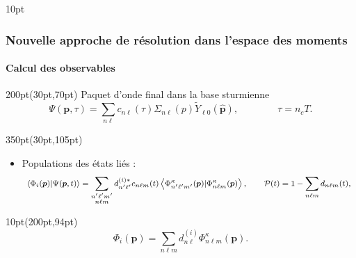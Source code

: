 \begin{frame}
\begin{textblock*}{10pt}
\end{textblock*}


\end{frame}

\begin{frame}
 \frametitle{Nouvelle approche de r\'esolution dans l'espace des moments}
 \framesubtitle{Calcul des observables}


\begin{textblock*}{200pt}(30pt,70pt)
\footnotesize
Paquet d'onde final dans la base sturmienne
\footnotesize
\begin{equation*}
   \Psi(\boldsymbol{p},\tau)
    = \sum_{n\ell} c_{n\ell}(\tau) \Sigma_{n\ell}(p)
       \widetilde{Y}_{\ell 0}(\hat{\boldsymbol{p}}),
\qquad\qquad \tau=n_{c}T.
    \label{eqn:final_wave}
\end{equation*}

\end{textblock*}


\begin{textblock*}{350pt}(30pt,105pt)
\begin{itemize}
\footnotesize
\item Populations des \'etats li\'es  :\hspace{30pt}
\begin{equation*}
\footnotesize
 \label{eqn:bound_state_pop}
 \left\langle \Phi_i(\boldsymbol{p}) | \Psi(\boldsymbol{p},t) \right\rangle
   = \sum_{\substack{n^\prime\ell^\prime m^\prime \\ n\ell m}}
    d_{n^\prime\ell^\prime}^{(i)\ast}  c_{n\ell m }(t)
  \left\langle \Phi_{n^\prime\ell^\prime m^\prime}^\kappa(\boldsymbol{p}) | \Phi_{n\ell m}^\kappa (\boldsymbol{p}) \right\rangle, 
 \qquad \mathcal{P}(t)=1-\sum_{n\ell m} d_{n\ell m}(t),
\end{equation*}
\end{itemize}
\end{textblock*}


\begin{textblock*}{10pt}(200pt,94pt)
\footnotesize
\begin{equation*}
  \Phi_i (\boldsymbol{p}) = \sum_{n\ell m} d_{n\ell}^{(i)}
    \Phi_{n\ell m}^\kappa (\boldsymbol{p}).
\end{equation*}
\end{textblock*}



\end{frame}
